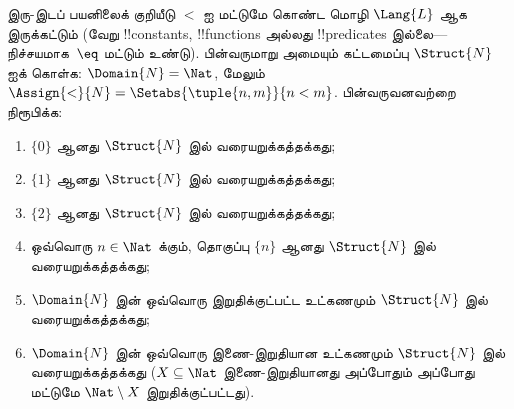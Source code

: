 \documentclass[../../../include/open-logic-section]{subfiles}
\begin{document}
\begin{prob}
இரு-இடப் பயனிலைக் குறியீடு $<$ ஐ மட்டுமே கொண்ட மொழி $\Lang{L}$ ஆக
இருக்கட்டும் (வேறு !!{constant}s, !!{function}s அல்லது !!{predicate}s
இல்லை---நிச்சயமாக~$\eq$ மட்டும் உண்டு). பின்வருமாறு அமையும் கட்டமைப்பு
$\Struct{N}$ ஐக் கொள்க:
$\Domain{N} = \Nat$, மேலும் $\Assign{<}{N} = \Setabs{\tuple{n,m}}{n <
  m}$. பின்வருவனவற்றை நிரூபிக்க:
\begin{enumerate}
\item $\{ 0 \}$ ஆனது $\Struct{N}$ இல் வரையறுக்கத்தக்கது;
\item $\{ 1 \}$ ஆனது $\Struct{N}$ இல் வரையறுக்கத்தக்கது;
\item $\{ 2 \}$ ஆனது $\Struct{N}$ இல் வரையறுக்கத்தக்கது;
\item ஒவ்வொரு $n \in \Nat$ க்கும், தொகுப்பு $\{ n \}$ ஆனது
  $\Struct{N}$ இல் வரையறுக்கத்தக்கது;
\item $\Domain{N}$ இன் ஒவ்வொரு இறுதிக்குட்பட்ட உட்கணமும்
  $\Struct{N}$ இல் வரையறுக்கத்தக்கது;
\item $\Domain{N}$ இன் ஒவ்வொரு இணை-இறுதியான உட்கணமும்
  $\Struct{N}$ இல் வரையறுக்கத்தக்கது ($X \subseteq \Nat$ இணை-இறுதியானது
  அப்போதும் அப்போது மட்டுமே $\Nat \setminus X$ இறுதிக்குட்பட்டது).
\end{enumerate}
\end{prob}
\end{document}
